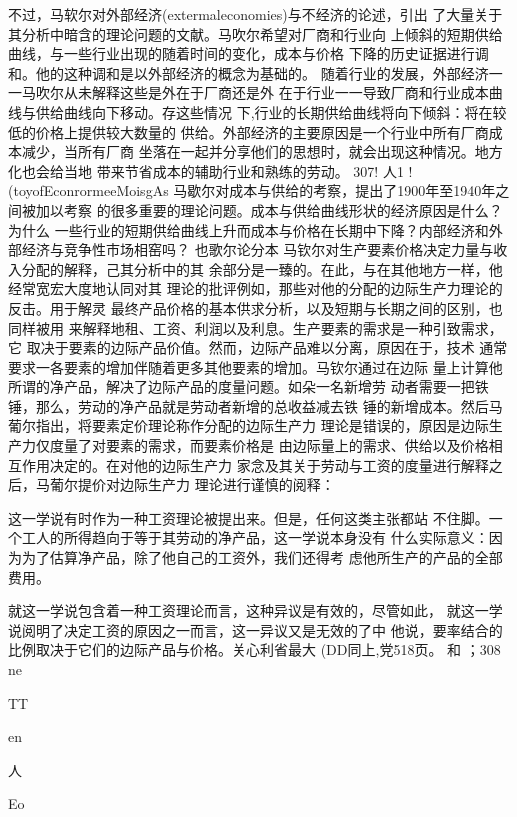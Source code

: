 不过，马软尔对外部经济(extermaleconomies)与不经济的论述，引出
了大量关于其分析中暗含的理论问题的文献。马吹尔希望对厂商和行业向
上倾斜的短期供给曲线，与一些行业出现的随着时间的变化，成本与价格
下降的历史证据进行调和。他的这种调和是以外部经济的概念为基础的。
随着行业的发展，外部经济一一马吹尔从未解释这些是外在于厂商还是外
在于行业一一导致厂商和行业成本曲线与供给曲线向下移动。存这些情况
下,行业的长期供给曲线将向下倾斜：将在较低的价格上提供较大数量的
供给。外部经济的主要原因是一个行业中所有厂商成本减少，当所有厂商
坐落在一起并分享他们的思想时，就会出现这种情况。地方化也会给当地
带来节省成本的辅助行业和熟练的劳动。
307!
人1
!(toyofEconrormeeMoisgAs
马歇尔对成本与供给的考察，提出了1900年至1940年之间被加以考察
的很多重要的理论问题。成本与供给曲线形状的经济原因是什么？为什么
一些行业的短期供给曲线上升而成本与价格在长期中下降？内部经济和外
部经济与竞争性市场相窑吗？
也歌尔论分本
马钦尔对生产要素价格决定力量与收入分配的解释，己其分析中的其
余部分是一臻的。在此，与在其他地方一样，他经常宽宏大度地认同对其
理论的批评例如，那些对他的分配的边际生产力理论的反击。用于解灵
最终产品价格的基本供求分析，以及短期与长期之间的区别，也同样被用
来解释地租、工资、利润以及利息。生产要素的需求是一种引致需求，它
取决于要素的边际产品价值。然而，边际产品难以分离，原因在于，技术
通常要求一各要素的增加伴随着更多其他要素的增加。马钦尔通过在边际
量上计算他所谓的净产品，解决了边际产品的度量问题。如朵一名新增劳
动者需要一把铁锤，那么，劳动的净产品就是劳动者新增的总收益减去铁
锤的新增成本。然后马葡尔指出，将要素定价理论称作分配的边际生产力
理论是错误的，原因是边际生产力仅度量了对要素的需求，而要素价格是
由边际量上的需求、供给以及价格相互作用决定的。在对他的边际生产力
家念及其关于劳动与工资的度量进行解释之后，马葡尔提价对边际生产力
理论进行谨慎的阅释：

这一学说有时作为一种工资理论被提出来。但是，任何这类主张都站
不住脚。一个工人的所得趋向于等于其劳动的净产品，这一学说本身没有
什么实际意义：因为为了估算净产品，除了他自己的工资外，我们还得考
虑他所生产的产品的全部费用。

就这一学说包含着一种工资理论而言，这种异议是有效的，尽管如此，
就这一学说阅明了决定工资的原因之一而言，这一异议又是无效的了中
他说，要率结合的比例取决于它们的边际产品与价格。关心利省最大
(DD同上,党518页。
和
；308
ne

TT

en

人

Eo


